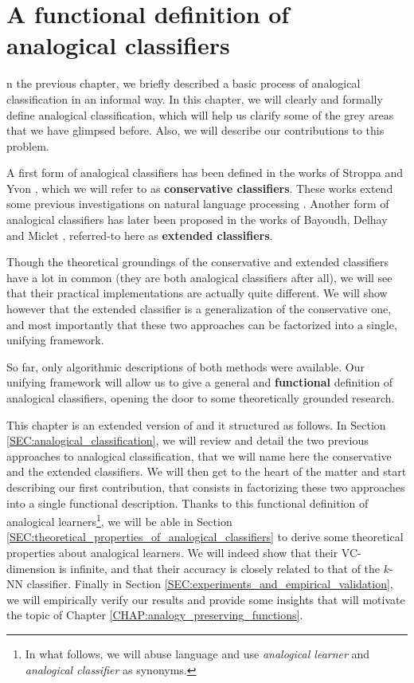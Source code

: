 \chapter{A functional definition of analogical classifiers}
\label{CHAP:functional_definition}
\localtableofcontents*
\vspace*{\baselineskip}

n the previous chapter, we
briefly described a basic process of analogical classification in an informal
way. In this chapter, we will clearly and formally define analogical
classification, which will help us clarify some of the grey areas that we have
glimpsed before. Also, we will describe our contributions to this problem.

A first form of analogical classifiers has been defined in the works of Stroppa
and Yvon \cite{StrYvoCNLL05}, which we will refer to as \textbf{conservative
classifiers}. These works extend some previous investigations on natural
language processing
\cite{PirYvo99, FedPirYvo95}. Another form of analogical classifiers has later been proposed in
the works of Bayoudh, Delhay and Miclet \cite{MicBayDelJAIR08,
BayMicDelIJCAI07}, referred-to here as \textbf{extended classifiers}.

Though the theoretical groundings of the conservative and extended
classifiers have a lot in common (they are both analogical classifiers after
all), we will see that their practical implementations are actually quite
different. We will show however that the extended classifier is a
generalization of the conservative one, and most importantly that these two
approaches can be factorized into a single, unifying framework.

So far, only algorithmic descriptions of both methods were available. Our
unifying framework will allow us to give a general and \textbf{functional}
definition of analogical classifiers, opening the door to some theoretically
grounded research.

This chapter is an extended version of \cite{HugPraRicSerECAI16} and it
structured as follows. In Section
\ref{SEC:analogical_classification}, we will review and detail the two previous
approaches to analogical classification, that we will name here the
conservative and the extended classifiers. We will then get to the heart of the
matter and start describing our first contribution, that consists in
factorizing these two approaches into a single functional description. Thanks to
this functional definition of analogical learners\footnote{In what follows, we
will abuse language and use \textit{analogical learner} and
\textit{analogical classifier} as synonyms.}, we will be able in Section
\ref{SEC:theoretical_properties_of_analogical_classifiers} to derive some
theoretical properties about analogical learners. We will indeed show that
their VC-dimension is infinite, and that their accuracy is closely related to
that of the $k$-NN classifier. Finally in Section
\ref{SEC:experiments_and_empirical_validation}, we will empirically verify our
results and provide some insights that will motivate the topic of Chapter
\ref{CHAP:analogy_preserving_functions}.


